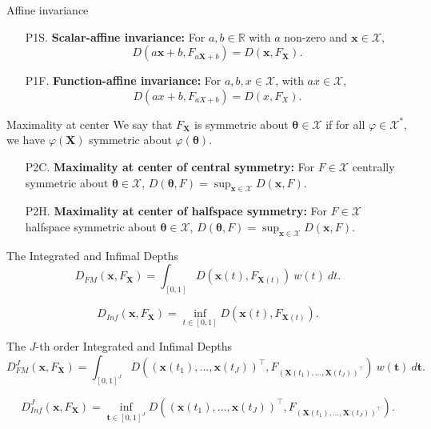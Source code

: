 \documentclass[handout, notes]{beamer}
\newcommand{\R}{\mathbb{R}}
\newcommand{\vx}{\bm{x}}
\newcommand{\vX}{\bm{X}}
\newcommand{\vth}{\bm{\theta}}
\begin{document}
    \begin{frame}{Affine invariance}
        \begin{enumerate}
            \item[P1S.] \textbf{Scalar-affine invariance:} For $a, b \in \R$
            with $a$ non-zero and $\vx \in \mathscr{X}$, \[
                D(a\vx + b, F_{a\vX + b}) = D(\vx, F_{\vX}).
            \]
            \item[P1F.] \textbf{Function-affine invariance:} For $a, b, x \in
            \mathscr{X}$, with $ax \in \mathscr{X}$, \[
                D(ax + b, F_{aX + b}) = D(x, F_{X}).
            \]
        \end{enumerate}
    \end{frame}

    \begin{frame}{Maximality at center}
        We say that $F_{\vX}$ is symmetric about $\vth \in \mathscr{X}$ if for
        all $\varphi \in \mathscr{X}^*$, we have $\varphi(\vX)$ symmetric
        about $\varphi(\vth)$.

        \begin{enumerate}
            \item[P2C.] \textbf{Maximality at center of central symmetry:} For
            $F \in \mathscr{X}$ centrally symmetric about $\vth \in
            \mathscr{X}$, $D(\vth, F) = \sup_{\vx \in \mathscr{X}} D(\vx, F)$.

            \item[P2H.] \textbf{Maximality at center of halfspace symmetry:} For
            $F \in \mathscr{X}$ halfspace symmetric about $\vth \in
            \mathscr{X}$, $D(\vth, F) = \sup_{\vx \in \mathscr{X}} D(\vx, F)$.
        \end{enumerate}
    \end{frame}

    \begin{frame}{The Integrated and Infimal Depths}
        \[
            D_{FM}(\vx, F_{\vX}) = \int_{[0, 1]} D(\vx(t), F_{\vX(t)})\:w(t)\:dt.
        \]

        \[
            D_{Inf}(\vx, F_{\vX}) = \inf_{t \in [0, 1]} D(\vx(t), F_{\vX(t)}).
        \]
    \end{frame}

    \begin{frame}{The $J$-th order Integrated and Infimal Depths}
        \[
            D_{FM}^J(\vx, F_{\vX}) = \int_{[0, 1]^J} D((\vx(t_1), \dots, \vx(t_J))^\top, F_{(\vX(t_1), \dots, \vX(t_J))^\top})\:w(\bm{t})\:d\bm{t}.
        \]

        \[
            D_{Inf}^J(\vx, F_{\vX}) = \inf_{\bm{t} \in [0, 1]^J} D((\vx(t_1), \dots, \vx(t_J))^\top, F_{(\vX(t_1), \dots, \vX(t_J))^\top}).
        \]
    \end{frame}
\end{document}
